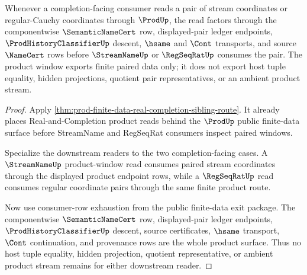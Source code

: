 \begin{theorem}
\label{thm:prod-regseqrat-streamname-product-window}
Whenever a completion-facing consumer reads a pair of stream coordinates or regular-Cauchy coordinates through $\ProdUp$, the read factors through the componentwise $\SemanticNameCert$ row, displayed-pair ledger endpoints, $\ProdHistoryClassifierUp$ descent, $\hsame$ and $\Cont$ transports, and source $\NameCert$ rows before $\StreamNameUp$ or $\RegSeqRatUp$ consumes the pair. The product window exports finite paired data only; it does not export host tuple equality, hidden projections, quotient pair representatives, or an ambient product stream.
\end{theorem}
\begin{proof}
Apply \autoref{thm:prod-finite-data-real-completion-sibling-route}. It already places Real-and-Completion product reads behind the $\ProdUp$ public finite-data surface before StreamName and RegSeqRat consumers inspect paired windows.

Specialize the downstream readers to the two completion-facing cases. A $\StreamNameUp$ product-window read consumes paired stream coordinates through the displayed product endpoint rows, while a $\RegSeqRatUp$ read consumes regular coordinate pairs through the same finite product route.

Now use consumer-row exhaustion from the public finite-data exit package. The componentwise $\SemanticNameCert$ row, displayed-pair ledger endpoints, $\ProdHistoryClassifierUp$ descent, source certificates, $\hsame$ transport, $\Cont$ continuation, and provenance rows are the whole product surface. Thus no host tuple equality, hidden projection, quotient representative, or ambient product stream remains for either downstream reader.
\end{proof}
